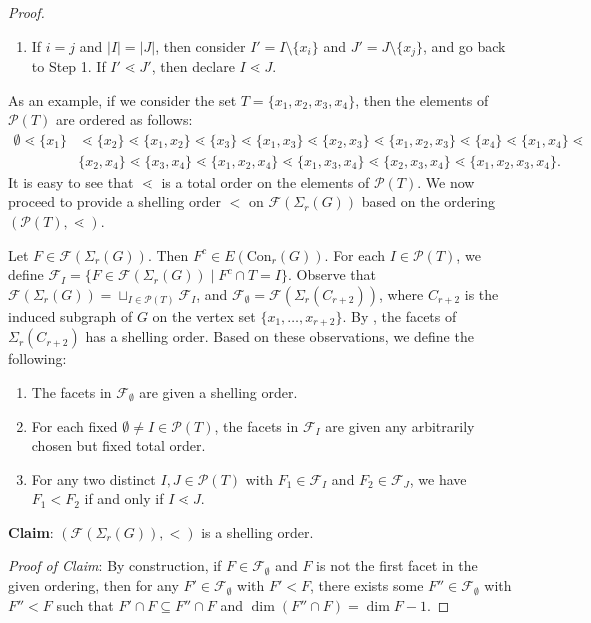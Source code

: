 \documentclass[12pt,reqno]{amsart}
\theoremstyle{definition}
\newcommand{\Con}{{\mathrm{Con}}}
\def\F{\mathcal{F}}
\begin{document}
\begin{proof}
\begin{enumerate}
		 	\item[{\bf Step 3:}] If $i=j$ and $|I|=|J|$, then consider $I'=I\setminus\{x_i\}$ and $J'=J\setminus\{x_j\}$, and go back to Step 1. If $I'\lessdot J'$, then declare $I\lessdot J$.
		 \end{enumerate}
		As an example, if we consider the set $T=\{x_1,x_2,x_3,x_4\}$, then the elements of $\mathcal P(T)$ are ordered as follows:
		 \begin{align*}
		 \emptyset\lessdot\{x_1\}&\lessdot\{x_2\}\lessdot\{x_1,x_2\}\lessdot\{x_3\}\lessdot\{x_1,x_3\}\lessdot\{x_2,x_3\}\lessdot\{x_1,x_2,x_3\}\lessdot\{x_4\}\lessdot\{x_1,x_4\}\lessdot\\
		 &\{x_2,x_4\}\lessdot\{x_3,x_4\}\lessdot\{x_1,x_2,x_4\}\lessdot\{x_1,x_3,x_4\}\lessdot\{x_2,x_3,x_4\}\lessdot\{x_1,x_2,x_3,x_4\}.
		 \end{align*}
		 It is easy to see that $\lessdot$ is a total order on the elements of $\mathcal P(T)$. We now proceed to provide a shelling order $<$ on $\mathcal F(\Sigma_{r}(G))$ based on the ordering $(\mathcal P(T),\lessdot)$.
		 
		 Let $F\in \mathcal F(\Sigma_{r}(G))$. Then $F^c\in E(\Con_r(G))$. For each $I\in\mathcal P(T)$, we define $\mathcal F_I=\{F\in \mathcal{F}(\Sigma_{r}(G))\mid F^c\cap T=I\}$. Observe that $\mathcal{F}(\Sigma_{r}(G))=\sqcup_{I\in\mathcal P(T)}\mathcal F_I$, and $\mathcal F_{\emptyset}=\mathcal F(\Sigma_{r}(C_{r+2}))$, where $C_{r+2}$ is the induced subgraph of $G$ on the vertex set $\{x_1,\ldots,x_{r+2}\}$. By , the facets of $\Sigma_{r}(C_{r+2})$ has a shelling order. Based on these observations, we define the following:   
		 \begin{enumerate}
		 	\item[$\bullet$] The facets in $\mathcal F_{\emptyset}$ are given a shelling order.
		 	
		 	\item[$\bullet$] For each fixed $\emptyset\neq I\in\mathcal P(T) $, the facets in $\F_I$ are given any arbitrarily chosen but fixed total order.
		 	
		 	\item[$\bullet$] For any two distinct $I,J\in \mathcal P(T)$ with $F_1\in \F_I$ and $F_2\in \F_J$, we have $F_1<F_2$ if and only if $I\lessdot J$.
		 \end{enumerate}
		 
		 \noindent
		 {\bf Claim}: $(\mathcal F(\Sigma_{r}(G)), <)$ is a shelling order.
		 
		 \vspace{.1cm}
		 \noindent
		 {\it Proof of Claim}: By construction, if $F\in \F_{\emptyset}$ and $F$ is not the first facet in the given ordering, then for any $F'\in \F_{\emptyset}$ with $F'<F$, there exists some $F''\in \F_{\emptyset}$ with $F''<F$ such that $F'\cap F\subseteq F''\cap F$ and $\dim(F''\cap F)=\dim F-1$.
		 

\end{proof}
\end{document}
